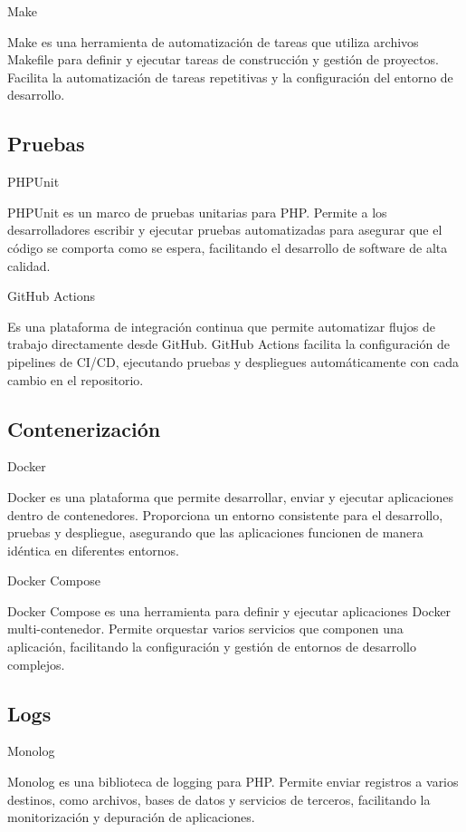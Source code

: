 Make

Make es una herramienta de automatización de tareas que utiliza archivos Makefile para definir y ejecutar tareas de
construcción y gestión de proyectos.
Facilita la automatización de tareas repetitivas y la configuración del entorno de desarrollo.

\subsection*{Pruebas}

PHPUnit

PHPUnit es un marco de pruebas unitarias para PHP. Permite a los desarrolladores escribir y ejecutar pruebas
automatizadas
para asegurar que el código se comporta como se espera, facilitando el desarrollo de software de alta calidad.

GitHub Actions

Es una plataforma de integración continua que permite automatizar flujos de trabajo directamente desde GitHub.
GitHub Actions facilita la configuración de pipelines de CI/CD, ejecutando pruebas y despliegues automáticamente con
cada cambio en el repositorio.

\subsection*{Contenerización}

Docker

Docker es una plataforma que permite desarrollar, enviar y ejecutar aplicaciones dentro de
contenedores.
Proporciona un entorno consistente para el desarrollo, pruebas y despliegue, asegurando que las aplicaciones funcionen
de manera idéntica en diferentes entornos.

Docker Compose

Docker Compose es una herramienta para definir y ejecutar aplicaciones Docker multi-contenedor.
Permite orquestar varios servicios que componen una aplicación, facilitando
la configuración y gestión de entornos de desarrollo complejos.

\subsection*{Logs}

Monolog

Monolog es una biblioteca de logging para PHP. Permite enviar registros a varios destinos, como archivos, bases de datos
y servicios de terceros, facilitando la monitorización y depuración de aplicaciones.

